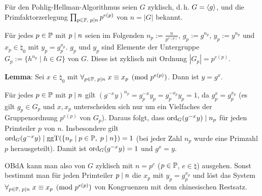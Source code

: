 Für den Pohlig-Hellman-Algorithmus seien $G$ zyklisch, d.\,h. $G = \langle g\rangle$, und
die Primfaktorzerlegung $\prod_{p \in \mathbb{P},\; p \mid n} p^{e(p)}$ von $n = |G|$ bekannt.

Für jedes $p \in \mathbb{P}$ mit $p \mid n$ seien im Folgenden
$n_p := \frac{n}{p^{e(p)}}$,
$g_p := g^{n_p}$,
$y_p := y^{n_p}$ und
$x_p \in \natural_0$ mit $y_p = g_p^{x_p}$.
$g_p$ und $y_p$ sind Elemente der Untergruppe $G_p := \{h^{n_p} \;|\; h \in G\}$ von $G$.
Diese ist zyklisch mit Ordnung $|G_p| = p^{e(p)}$.

\textbf{Lemma}:
Sei $x \in \natural_0$ mit
$\forall_{p \in \mathbb{P},\; p \mid n}\; x \equiv x_p \pmod{p^{e(p)}}$.
Dann ist $y = g^x$.

\begin{Beweis}
    Für jedes $p \in \mathbb{P}$ mit $p \mid n$ gilt
    $(g^{-x} y)^{n_p} = g_p^{-x} y_p = g_p^{-x_p} y_p = 1$,
    da $g_p^x = g_p^{x_p}$
    (es gilt $g_p \in G_p$ und $x, x_p$ unterscheiden sich nur um ein Vielfaches der
    Gruppenordnung $p^{e(p)}$ von $G_p$).
    Daraus folgt, dass $\operatorname{ord}_G(g^{-x} y) \mid n_p$ für jeden Primteiler $p$ von $n$.
    Insbesondere gilt\\
    $\operatorname{ord}_G(g^{-x} y) \mid \operatorname{ggT}(\{n_p \;|\; p \in \mathbb{P},\; p \mid n\}) = 1$
    (bei jeder Zahl $n_p$ wurde eine Primzahl $p$ herausgeteilt).
    Damit ist $\operatorname{ord}_G(g^{-x} y) = 1$ und $g^x = y$.
\end{Beweis}

\linie

OBdA kann man also von $G$ zyklisch mit $n = p^e$ ($p \in \mathbb{P}$, $e \in \natural$)
ausgehen.
Sonst bestimmt man für jeden Primteiler $p \mid n$ die $x_p$ mit $y_p = g_p^{x_p}$
und löst das System $\forall_{p \in \mathbb{P},\; p \mid n}\; x \equiv x_p \pmod{p^{e(p)}}$
von Kongruenzen mit dem chinesischen Restsatz.

